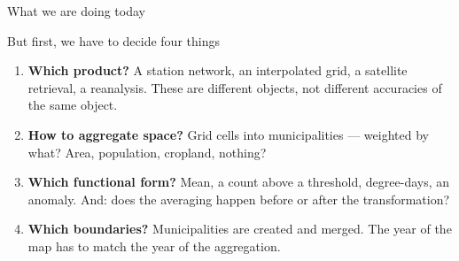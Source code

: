 \documentclass[aspectratio=169,10pt]{beamer}
\newcommand{\dtag}[2]{{\ttfamily\scriptsize\color{#1}#2}}
\newcommand{\dsub}[1]{{\scriptsize\color{climgrey}#1}}
\begin{document}
\begin{frame}{What we are doing today}
\begin{center}
  \end{center}
\end{frame}

\begin{frame}{But first, we have to decide four things}

  \begin{enumerate}
    \small
    \item \textbf{Which product?} A station network, an interpolated grid, a
          satellite retrieval, a reanalysis. These are different objects, not
          different accuracies of the same object.
    \item \textbf{How to aggregate space?} Grid cells into municipalities ---
          weighted by what? Area, population, cropland, nothing?
    \item \textbf{Which functional form?} Mean, a count above a threshold,
          degree-days, an anomaly. And: does the averaging happen before or after
          the transformation?
    \item \textbf{Which boundaries?} Municipalities are created and merged. The
          year of the map has to match the year of the aggregation.
  \end{enumerate}
\end{frame}
\end{document}
